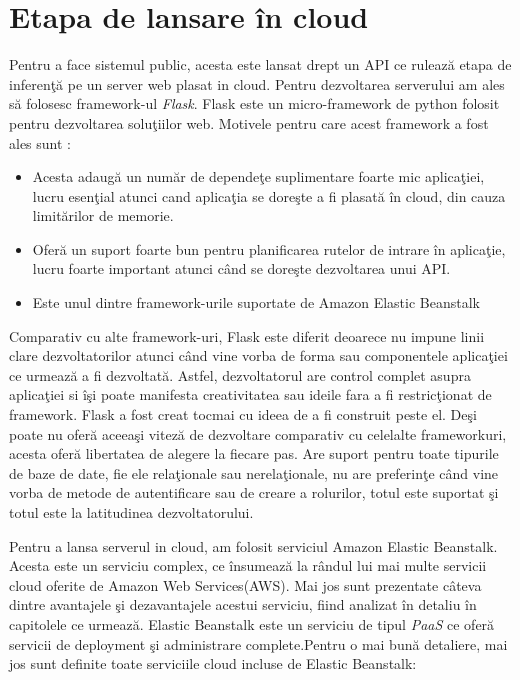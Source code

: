 \documentclass[a4paper,12pt]{report}
\begin{document}
\section{Etapa de lansare în cloud}
Pentru a face sistemul public, acesta este lansat drept un API ce rulează etapa de inferenţă pe un server web plasat in cloud. Pentru dezvoltarea serverului am ales să folosesc framework-ul \emph{Flask}. Flask este un micro-framework de python folosit pentru dezvoltarea soluţiilor web. Motivele pentru care acest framework a fost ales sunt : 
\begin{itemize}
\item Acesta adaugă un număr de dependeţe suplimentare foarte mic aplicaţiei, lucru esenţial atunci cand aplicaţia se doreşte a fi plasată în cloud, din cauza limitărilor de memorie. 
\item Oferă un suport foarte bun pentru planificarea rutelor de intrare în aplicaţie, lucru foarte important atunci când se doreşte dezvoltarea unui API.
\item Este unul dintre framework-urile suportate de Amazon Elastic Beanstalk 
\end{itemize}
\par
Comparativ cu alte framework-uri, Flask este diferit deoarece nu impune linii clare dezvoltatorilor atunci când vine vorba de forma sau componentele aplicaţiei ce urmează a fi dezvoltată. Astfel, dezvoltatorul are control complet asupra aplicaţiei si îşi poate manifesta creativitatea sau ideile fara a fi restricţionat de framework.  Flask a fost creat tocmai cu ideea de a fi construit peste el. Deşi poate nu oferă aceeaşi viteză de dezvoltare comparativ cu celelalte frameworkuri, acesta oferă libertatea de alegere la fiecare pas. Are suport pentru toate tipurile de baze de date, fie ele relaţionale sau nerelaţionale,  nu are preferinţe când vine vorba de metode de autentificare sau de creare a rolurilor, totul este suportat şi totul este la latitudinea dezvoltatorului. 
\cite{flask2014}
\par
Pentru a lansa serverul in cloud, am folosit serviciul Amazon Elastic Beanstalk. Acesta este un serviciu complex, ce însumează la rândul lui mai multe servicii cloud oferite de Amazon Web Services(AWS). Mai jos sunt prezentate câteva dintre avantajele şi dezavantajele acestui serviciu, fiind analizat în detaliu în capitolele ce urmează.  Elastic Beanstalk este un serviciu de tipul \emph{PaaS}  ce oferă servicii de deployment şi administrare complete.Pentru o mai bună detaliere, mai jos sunt definite toate serviciile cloud incluse de Elastic Beanstalk: 
\end{document}
